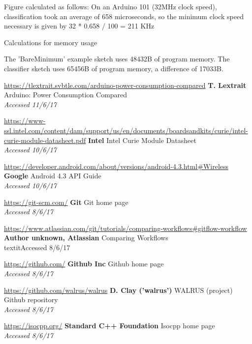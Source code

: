 \documentclass[a4paper]{article}
\begin{document}
\begin{thebibliography}{9}

Figure calculated as follows: On an Arduino 101 (32MHz clock speed), classification took an average of 658 microseconds, so the minimum clock speed necessary is given by 32 * 0.658 / 100 = 211 KHz

Calculations for memory usage

The 'BareMinimum' example sketch uses 48432B of program memory. The classifier sketch uses 65456B of program memory, a difference of 17033B.

\url{https://tlextrait.svbtle.com/arduino-power-consumption-compared}
\textbf{T. Lextrait}
Arduino: Power Consumption Compared
\\\textit{Accessed 11/6/17}

\url{https://www-ssl.intel.com/content/dam/support/us/en/documents/boardsandkits/curie/intel-curie-module-datasheet.pdf}
\textbf{Intel}
Intel Curie Module Datasheet
\\\textit{Accessed 10/6/17}

\url{https://developer.android.com/about/versions/android-4.3.html#Wireless}
\textbf{Google}
Android 4.3 API Guide
\\\textit{Accessed 10/6/17}


\url{https://git-scm.com/}
\textbf{Git }
Git home page
\\\textit{Accessed 8/6/17}

\url{https://www.atlassian.com/git/tutorials/comparing-workflows#gitflow-workflow}
\textbf{Author unknown, Atlassian}
Comparing Workflows
\\textit{Accessed 8/6/17}

\url{https://github.com/}
\textbf{Github Inc}
Github home page
\\\textit{Accessed 8/6/17}

\url{https://github.com/walrus/walrus}
\textbf{D. Clay ('walrus')}
WALRUS (project) Github repository
\\\textit{Accessed 8/6/17}

\url{https://isocpp.org/}
\textbf{Standard C++ Foundation}
Isocpp home page
\\\textit{Accessed 8/6/17}


\end{thebibliography}
\end{document}
